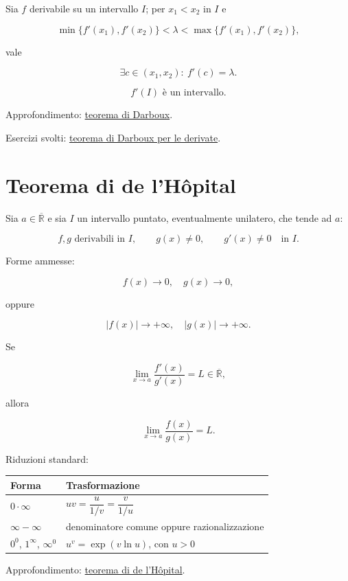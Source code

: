 Sia \(f\) derivabile su un intervallo \(I\); per \(x_1<x_2\) in \(I\) e

\[
\min\{f'(x_1),f'(x_2)\}<\lambda<\max\{f'(x_1),f'(x_2)\},
\]

vale

\[
\exists c\in(x_1,x_2):\ f'(c)=\lambda.
\]

\[
f'(I)\text{ è un intervallo}.
\]

Approfondimento: \href{https://ingegnerismo.it/matematica/teorema-di-darboux/}{teorema di Darboux}.

Esercizi svolti: \href{https://ingegnerismo.it/matematica/teorema-di-darboux-esercizi/}{teorema di Darboux per le derivate}.

\section{Teorema di de l'Hôpital}\label{teorema-di-de-lhuxf4pital}

Sia \(a\in\overline{\mathbb R}\) e sia \(I\) un intervallo puntato, eventualmente unilatero, che tende ad \(a\):

\[
\displaystyle
f,g\text{ derivabili in }I,
\qquad
g(x)\ne0,
\qquad
g'(x)\ne0
\quad\text{in }I.
\]

Forme ammesse:

\[
\displaystyle
f(x)\to0,
\quad g(x)\to0,
\]

oppure

\[
\displaystyle
|f(x)|\to+\infty,
\quad |g(x)|\to+\infty.
\]

Se

\[
\displaystyle
\lim_{x\to a}\frac{f'(x)}{g'(x)}=L
\in\overline{\mathbb R},
\]

allora

\[
\displaystyle
\lim_{x\to a}\frac{f(x)}{g(x)}=L.
\]

Riduzioni standard:

\begin{longtable}[]{@{}ll@{}}
\toprule\noalign{}
Forma & Trasformazione \\
\midrule\noalign{}
\endhead
\bottomrule\noalign{}
\endlastfoot
\(0\cdot\infty\) & \(u v=\dfrac{u}{1/v}=\dfrac{v}{1/u}\) \\
\(\infty-\infty\) & denominatore comune oppure razionalizzazione \\
\(0^0\), \(1^\infty\), \(\infty^0\) & \(u^v=\exp(v\ln u)\), con \(u>0\) \\
\end{longtable}

Approfondimento: \href{https://ingegnerismo.it/matematica/teorema-di-de-l-hopital/}{teorema di de l'Hôpital}.
